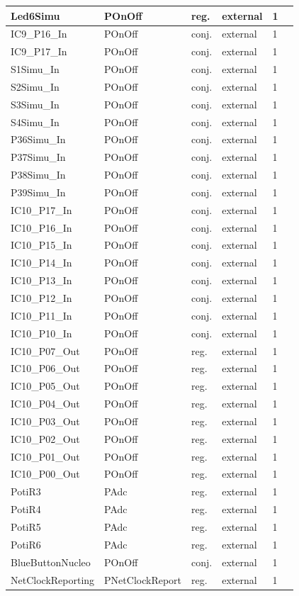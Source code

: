 \begin{tabular}[ht]{|l|l|l|l|l|p{5cm}|}
\hline
Led6Simu & POnOff & reg. & external & 1 & \\
\hline
IC9\_P16\_In & POnOff & conj. & external & 1 & \\
\hline
IC9\_P17\_In & POnOff & conj. & external & 1 & \\
\hline
S1Simu\_In & POnOff & conj. & external & 1 & \\
\hline
S2Simu\_In & POnOff & conj. & external & 1 & \\
\hline
S3Simu\_In & POnOff & conj. & external & 1 & \\
\hline
S4Simu\_In & POnOff & conj. & external & 1 & \\
\hline
P36Simu\_In & POnOff & conj. & external & 1 & \\
\hline
P37Simu\_In & POnOff & conj. & external & 1 & \\
\hline
P38Simu\_In & POnOff & conj. & external & 1 & \\
\hline
P39Simu\_In & POnOff & conj. & external & 1 & \\
\hline
IC10\_P17\_In & POnOff & conj. & external & 1 & \\
\hline
IC10\_P16\_In & POnOff & conj. & external & 1 & \\
\hline
IC10\_P15\_In & POnOff & conj. & external & 1 & \\
\hline
IC10\_P14\_In & POnOff & conj. & external & 1 & \\
\hline
IC10\_P13\_In & POnOff & conj. & external & 1 & \\
\hline
IC10\_P12\_In & POnOff & conj. & external & 1 & \\
\hline
IC10\_P11\_In & POnOff & conj. & external & 1 & \\
\hline
IC10\_P10\_In & POnOff & conj. & external & 1 & \\
\hline
IC10\_P07\_Out & POnOff & reg. & external & 1 & \\
\hline
IC10\_P06\_Out & POnOff & reg. & external & 1 & \\
\hline
IC10\_P05\_Out & POnOff & reg. & external & 1 & \\
\hline
IC10\_P04\_Out & POnOff & reg. & external & 1 & \\
\hline
IC10\_P03\_Out & POnOff & reg. & external & 1 & \\
\hline
IC10\_P02\_Out & POnOff & reg. & external & 1 & \\
\hline
IC10\_P01\_Out & POnOff & reg. & external & 1 & \\
\hline
IC10\_P00\_Out & POnOff & reg. & external & 1 & \\
\hline
PotiR3 & PAdc & reg. & external & 1 & \\
\hline
PotiR4 & PAdc & reg. & external & 1 & \\
\hline
PotiR5 & PAdc & reg. & external & 1 & \\
\hline
PotiR6 & PAdc & reg. & external & 1 & \\
\hline
BlueButtonNucleo & POnOff & conj. & external & 1 & \\
\hline
NetClockReporting & PNetClockReport & reg. & external & 1 & \\
\hline
\end{tabular}

